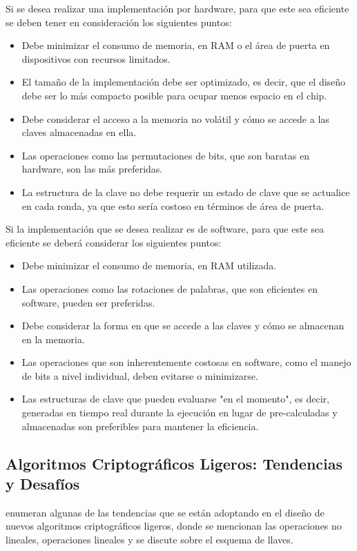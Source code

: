 \documentclass[a4paper,10pt]{article}
\begin{document}
	Si se desea realizar una implementación por hardware, para que este sea eficiente se deben tener en consideración los siguientes puntos:
	\begin{itemize}
		\item Debe minimizar el consumo de memoria, en RAM o el área de puerta en dispositivos con recursos limitados.
		\item El tamaño de la implementación debe ser optimizado, es decir, que el diseño debe ser lo más compacto posible para ocupar menos espacio en el chip.
		\item Debe considerar el acceso a la memoria no volátil y cómo se accede a las claves almacenadas en ella.
		\item Las operaciones como las permutaciones de bits, que son baratas en hardware, son las más preferidas.
		\item La estructura de la clave no debe requerir un estado de clave que se actualice en cada ronda, ya que esto sería costoso en términos de área de puerta.
	\end{itemize}
	Si la implementación que se desea realizar es de software, para que este sea eficiente se deberá considerar los siguientes puntos:
	\begin{itemize}
		\item Debe minimizar el consumo de memoria, en RAM utilizada.
		\item Las operaciones como las rotaciones de palabras, que son eficientes en software, pueden ser preferidas.
		\item Debe considerar la forma en que se accede a las claves y cómo se almacenan en la memoria.
		\item Las operaciones que son inherentemente costosas en software, como el manejo de bits a nivel individual, deben evitarse o minimizarse.
		\item Las estructuras de clave que pueden evaluarse "en el momento", es decir, generadas en tiempo real durante la ejecución en lugar de pre-calculadas y almacenadas son preferibles para mantener la eficiencia.
	\end{itemize}
	\subsection{Algoritmos Criptográficos Ligeros: Tendencias y Desafíos}
	\textcite{biryukov2017state} enumeran algunas de las tendencias que se están adoptando en el diseño de nuevos algoritmos criptográficos ligeros, donde se mencionan las operaciones no lineales, operaciones lineales y se discute sobre el esquema de llaves.
	
\end{document}
